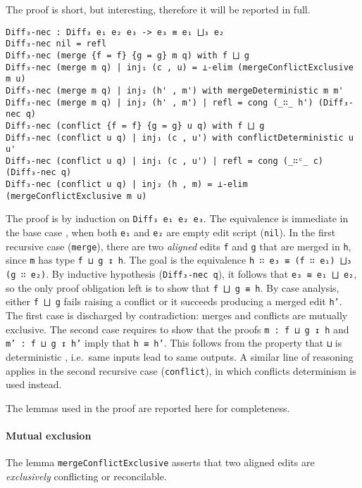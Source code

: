 \documentclass[../Thesis.tex]{subfiles}
\begin{document}
	The proof is short, but interesting, therefore it will
	be reported in full.
	
\begin{verbatim}
Diff₃-nec : Diff₃ e₁ e₂ e₃ -> e₃ ≡ e₁ ⨆₃ e₂
Diff₃-nec nil = refl
Diff₃-nec (merge {f = f} {g = g} m q) with f ⨆ g
Diff₃-nec (merge m q) | inj₁ (c , u) = ⊥-elim (mergeConflictExclusive m u)
Diff₃-nec (merge m q) | inj₂ (h' , m') with mergeDeterministic m m'
Diff₃-nec (merge m q) | inj₂ (h' , m') | refl = cong (_∷_ h') (Diff₃-nec q)
Diff₃-nec (conflict {f = f} {g = g} u q) with f ⨆ g
Diff₃-nec (conflict u q) | inj₁ (c , u') with conflictDeterministic u u'
Diff₃-nec (conflict u q) | inj₁ (c , u') | refl = cong (_∷ᶜ_ c) (Diff₃-nec q)
Diff₃-nec (conflict u q) | inj₂ (h , m) = ⊥-elim (mergeConflictExclusive m u)	
\end{verbatim}

	The proof is by induction on \texttt{Diff₃ e₁ e₂ e₃}.
	The equivalence is immediate in the base case	, when both
	\texttt{e₁} and \texttt{e₂} are empty edit script (\texttt{nil}).
	In the first recursive case (\texttt{merge}), there are 
	two \emph{aligned} edits \texttt{f} and \texttt{g} that are
	merged in \texttt{h}, since \texttt{m} has type \texttt{f ⊔ g ↧ h}.
	The goal is the equivalence \texttt{h ∷ e₃ ≡ (f ∷ e₁) ⨆₃ (g ∷ e₂)}. By inductive 
	hypothesis (\texttt{Diff₃-nec q}), it follows that \texttt{e₃ ≡ e₁ ⨆ e₂}, so
	the only proof obligation left is to show that \texttt{f ⨆ g ≡ h}.
	By case analysis, either \texttt{f ⨆ g} fails raising a conflict or it succeeds
	producing a merged edit \texttt{h'}.
	The first case is discharged by contradiction: merges and conflicts
	are mutually exclusive.
	The second case requires to show that the proofs \texttt{m : f ⊔ g ↧ h}
	and \texttt{m' : f ⊔ g ↧ h'} imply that \texttt{h ≡ h'}.
	This follows from the property that \texttt{⊔} is deterministic 
	\cite{AlgebraOfProgramming}, i.e.\ same inputs lead to same outputs.
	A similar line of reasoning applies in the second recursive
	case (\texttt{conflict}), in which conflicts determinism
	is used instead.
	
	The lemmas used in the proof are reported here for completeness.

	\paragraph{Mutual exclusion}
	\label{par:MutualExclusion}
	The lemma \texttt{mergeConflictExclusive} asserts that two aligned edits
	are \emph{exclusively} conflicting or reconcilable.
	
\end{document}
